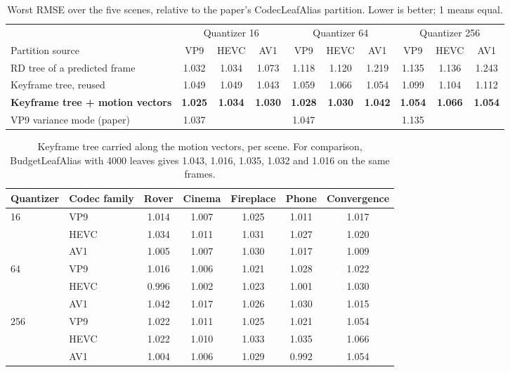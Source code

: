 \documentclass[10pt]{article}
\begin{document}
\begin{table}[H]
\centering\small
\begin{tabular}{lccccccccc}
\toprule
& \multicolumn{3}{c}{Quantizer 16} & \multicolumn{3}{c}{Quantizer 64} & \multicolumn{3}{c}{Quantizer 256} \\
\cmidrule(lr){2-4}\cmidrule(lr){5-7}\cmidrule(lr){8-10}
Partition source & VP9 & HEVC & AV1 & VP9 & HEVC & AV1 & VP9 & HEVC & AV1 \\
\midrule
RD tree of a predicted frame & 1.032 & 1.034 & 1.073 & 1.118 & 1.120 & 1.219 & 1.135 & 1.136 & 1.243 \\
Keyframe tree, reused & 1.049 & 1.049 & 1.043 & 1.059 & 1.066 & 1.054 & 1.099 & 1.104 & 1.112 \\
\textbf{Keyframe tree + motion vectors} & \textbf{1.025} & \textbf{1.034} & \textbf{1.030} & \textbf{1.028} & \textbf{1.030} & \textbf{1.042} & \textbf{1.054} & \textbf{1.066} & \textbf{1.054} \\
\midrule
VP9 variance mode (paper) & 1.037 & & & 1.047 & & & 1.135 & & \\
\bottomrule
\end{tabular}
\caption{Worst RMSE over the five scenes, relative to the paper's CodecLeafAlias partition. Lower is better; 1 means equal.}
\label{tab:worst}
\end{table}

\begin{table}[H]
\centering\small
\begin{tabular}{llccccc}
\toprule
Quantizer & Codec family & Rover & Cinema & Fireplace & Phone & Convergence \\
\midrule
16 & VP9 & 1.014 & 1.007 & 1.025 & 1.011 & 1.017 \\
& HEVC & 1.034 & 1.011 & 1.031 & 1.027 & 1.020 \\
& AV1 & 1.005 & 1.007 & 1.030 & 1.017 & 1.009 \\
\midrule
64 & VP9 & 1.016 & 1.006 & 1.021 & 1.028 & 1.022 \\
& HEVC & 0.996 & 1.002 & 1.023 & 1.001 & 1.030 \\
& AV1 & 1.042 & 1.017 & 1.026 & 1.030 & 1.015 \\
\midrule
256 & VP9 & 1.022 & 1.011 & 1.025 & 1.021 & 1.054 \\
& HEVC & 1.022 & 1.010 & 1.033 & 1.035 & 1.066 \\
& AV1 & 1.004 & 1.006 & 1.029 & 0.992 & 1.054 \\
\bottomrule
\end{tabular}
\caption{Keyframe tree carried along the motion vectors, per scene. For comparison, BudgetLeafAlias with 4000 leaves gives 1.043, 1.016, 1.035, 1.032 and 1.016 on the same frames.}
\label{tab:kfmv}
\end{table}
\end{document}

